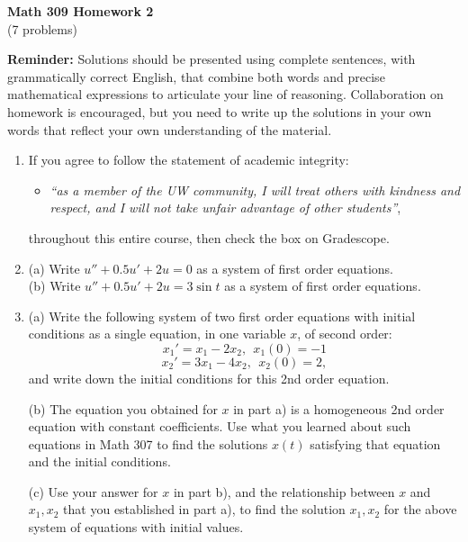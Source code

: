 \documentclass[11pt]{article}
\theoremstyle{definition}
\begin{document}
\begin{center}
\textbf{Math 309 Homework 2}\\
(7 problems)
\end{center}
\vspace{0.2in}


\noindent  \textbf{Reminder:} Solutions should be presented using complete sentences, with grammatically correct English, that combine both words and precise mathematical expressions to articulate your line of reasoning.  Collaboration on homework is encouraged, but you need to write up the solutions in your own words that reflect your own understanding of the material. \\

\begin{enumerate}[leftmargin=*]
\item  If you agree to follow the statement of academic integrity:
\begin{itemize}
\item [ ] 
\emph{``as a member of the UW community, I will treat others with kindness and respect, and I will not take unfair advantage of other students''},
\end{itemize}
throughout this entire course, then check the box on Gradescope.  \\

 \item (a) Write $u''+0.5u'+2u=0$ as a system of first order equations.\\
(b) Write  $u''+0.5u'+2u=3\sin t$ as a system of first order equations.\\

\item (a) Write the following system of two first order equations with initial conditions as a single equation, in one variable $x$, of second order:
\[x_1'=x_1-2x_2, \ \ x_1(0)=-1\]
\[x_2'=3x_1-4x_2,\  \ x_2(0)=2,\]
and write down the initial conditions for this 2nd order equation.

(b) The equation you obtained for $x$ in part a) is a homogeneous 2nd order equation with constant coefficients.  Use what you learned about such equations in Math 307 to find the solutions $x(t)$ satisfying that equation and the initial conditions.

(c)  Use your answer for $x$ in part b), and the relationship  between $x$ and $x_1, x_2$ that you established in part a),  to find the solution $x_1, x_2$ for the above system of equations with initial values.


\end{enumerate}
\end{document}
